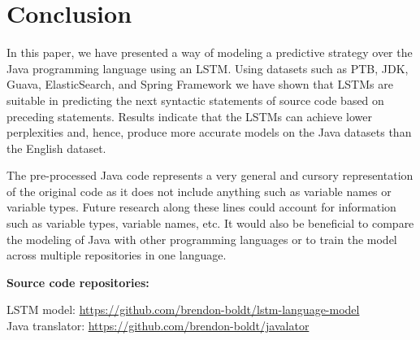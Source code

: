 \documentclass[runningheads,a4paper]{llncs}
\begin{document}
\section{Conclusion}

In this paper, we have presented a way of modeling a predictive strategy
over the Java programming language using an LSTM. Using datasets such as PTB,
JDK, Guava, ElasticSearch, and Spring Framework we have shown that
LSTMs are suitable in predicting the next syntactic statements of source
code based on preceding statements. Results indicate that the
LSTMs can achieve lower perplexities and, hence, produce more accurate models
on the Java datasets than the English dataset.

The pre-processed Java code represents a very general and cursory
representation of the original code as it does not include anything such
as variable names or variable types. Future research along these lines
could account for information such as variable types, variable names, etc.
It would also be beneficial to compare the modeling of Java with other
programming languages or to train the model across multiple repositories
in one language.

\vspace{5mm}

\noindent
\textbf{Source code repositories:}

\vspace{2mm}

\noindent
LSTM model:
\url{https://github.com/brendon-boldt/lstm-language-model} \\
Java translator:
\url{https://github.com/brendon-boldt/javalator}
\end{document}
